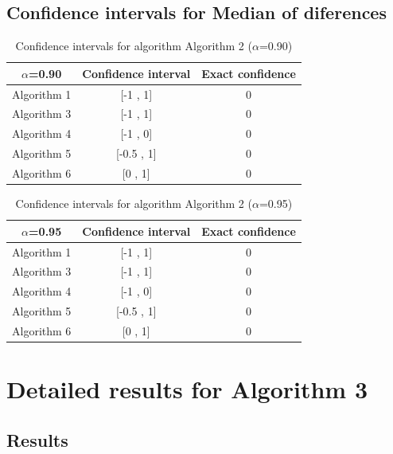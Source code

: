 \documentclass[a4paper,10pt]{article}
\begin{document}
\subsection{Confidence intervals for Median of diferences}

\begin{table}[!htp]
\centering\small
\begin{tabular}{
|c|c|c|}
\hline
 $\alpha$=0.90 & Confidence interval & Exact confidence \\ \hline 
Algorithm 1 & [-1 , 1] & 0\\ \hline 
Algorithm 3 & [-1 , 1] & 0\\ \hline 
Algorithm 4 & [-1 , 0] & 0\\ \hline 
Algorithm 5 & [-0.5 , 1] & 0\\ \hline 
Algorithm 6 & [0 , 1] & 0\\ \hline 

\end{tabular}
\caption{Confidence intervals for algorithm Algorithm 2 ($\alpha$=0.90)}
\end{table}
\begin{table}[!htp]
\centering\small
\begin{tabular}{
|c|c|c|}
\hline
 $\alpha$=0.95 & Confidence interval & Exact confidence \\ \hline 
Algorithm 1 & [-1 , 1] & 0\\ \hline 
Algorithm 3 & [-1 , 1] & 0\\ \hline 
Algorithm 4 & [-1 , 0] & 0\\ \hline 
Algorithm 5 & [-0.5 , 1] & 0\\ \hline 
Algorithm 6 & [0 , 1] & 0\\ \hline 

\end{tabular}
\caption{Confidence intervals for algorithm Algorithm 2 ($\alpha$=0.95)}
\end{table}

 \clearpage 


\section{Detailed results for Algorithm 3}


\subsection{Results}
\end{document}
